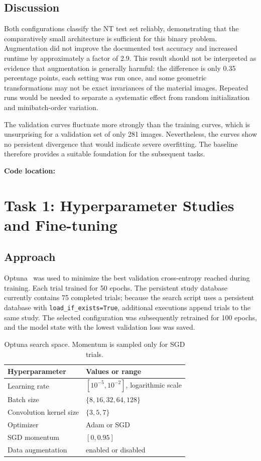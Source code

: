 \documentclass[11pt]{article}
\newcommand{\code}[1]{\texttt{#1}}
\newcommand{\codelocation}[1]{\par\smallskip\noindent\textbf{Code location:} \path{#1}}
\begin{document}
\subsection{Discussion}

Both configurations classify the NT test set reliably, demonstrating that the comparatively small architecture is sufficient for this binary problem. Augmentation did not improve the documented test accuracy and increased runtime by approximately a factor of 2.9. This result should not be interpreted as evidence that augmentation is generally harmful: the difference is only 0.35 percentage points, each setting was run once, and some geometric transformations may not be exact invariances of the material images. Repeated runs would be needed to separate a systematic effect from random initialization and minibatch-order variation.

The validation curves fluctuate more strongly than the training curves, which is unsurprising for a validation set of only 281 images. Nevertheless, the curves show no persistent divergence that would indicate severe overfitting. The baseline therefore provides a suitable foundation for the subsequent tasks.

\codelocation{tasks/task_0_baseline_cnn/}

\clearpage
\section{Task 1: Hyperparameter Studies and Fine-tuning}

\subsection{Approach}

Optuna~\cite{akiba2019optuna} was used to minimize the best validation cross-entropy reached during training. Each trial trained for 50 epochs. The persistent study database currently contains 75 completed trials; because the search script uses a persistent database with \code{load\_if\_exists=True}, additional executions append trials to the same study. The selected configuration was subsequently retrained for 100 epochs, and the model state with the lowest validation loss was saved.

\begin{table}[H]
\centering
\caption{Optuna search space. Momentum is sampled only for SGD trials.}
\label{tab:search-space}
\begin{tabular}{ll}
\toprule
Hyperparameter & Values or range \\
\midrule
Learning rate & $[10^{-5},10^{-2}]$, logarithmic scale \\
Batch size & $\{8,16,32,64,128\}$ \\
Convolution kernel size & $\{3,5,7\}$ \\
Optimizer & Adam or SGD \\
SGD momentum & $[0,0.95]$ \\
Data augmentation & enabled or disabled \\
\bottomrule
\end{tabular}
\end{table}
\end{document}
